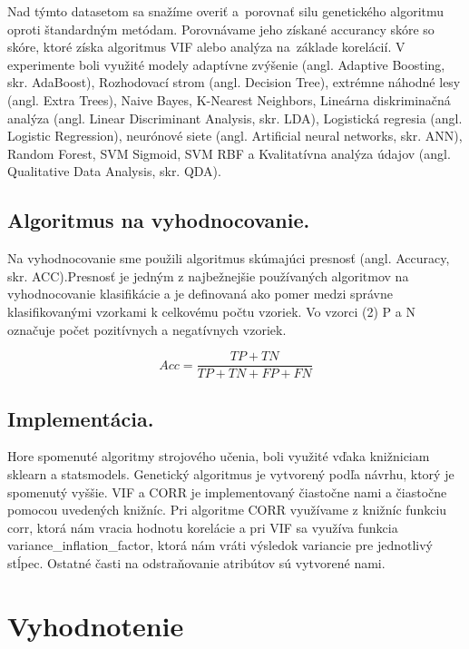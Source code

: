 \documentclass[runningheads]{llncs}
\begin{document}
Nad týmto datasetom sa snažíme overiť a~porovnať silu genetického algoritmu oproti štandardným metódam. Porovnávame 
jeho získané accurancy skóre so skóre, ktoré získa algoritmus VIF alebo analýza na~základe korelácií. V experimente boli využité modely
adaptívne zvýšenie
(angl. Adaptive Boosting, skr. AdaBoost), Rozhodovací strom (angl. Decision Tree), extrémne náhodné lesy (angl. Extra Trees), Naive Bayes, K-Nearest Neighbors, Lineárna diskriminačná analýza (angl. Linear Discriminant Analysis, skr. LDA), 
Logistická regresia (angl. Logistic Regression), neurónové siete (angl. Artificial neural networks, skr. ANN), Random Forest, SVM Sigmoid, SVM RBF a Kvalitatívna analýza údajov (angl. Qualitative Data Analysis, skr. QDA).

\subsection{Algoritmus na vyhodnocovanie.}

Na vyhodnocovanie sme použili algoritmus skúmajúci presnosť (angl. Accuracy, skr. ACC).Presnosť je jedným z najbežnejšie používaných algoritmov na vyhodnocovanie klasifikácie a je definovaná ako pomer medzi správne klasifikovanými vzorkami k celkovému počtu vzoriek. 
Vo vzorci (2) P a N označuje počet pozitívnych a negatívnych vzoriek. ~\cite{ref_sokolova}

\begin{equation}
Acc = \frac{TP+TN}{TP+TN+FP+FN}
\end{equation}  

\subsection{Implementácia.}

Hore spomenuté algoritmy strojového učenia, boli využité vďaka knižniciam sklearn a statsmodels. Genetický algoritmus je vytvorený podľa návrhu, ktorý je spomenutý vyššie. VIF a CORR je implementovaný čiastočne nami a čiastočne pomocou uvedených knižníc. Pri algoritme CORR využívame z knižníc funkciu corr, ktorá nám vracia hodnotu korelácie a pri VIF sa využíva funkcia variance\_inflation\_factor, ktorá nám vráti výsledok variancie pre jednotlivý stĺpec. Ostatné časti na odstraňovanie atribútov sú vytvorené nami.

\section{Vyhodnotenie}
\end{document}
